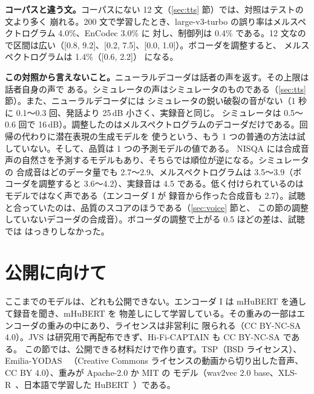 \documentclass[10pt,a4paper,twocolumn]{article}
\begin{document}
\textbf{コーパスと違う文。}コーパスにない 12 文（\ref{sec:tts} 節）では、対照はテストの文より多く
崩れる。200 文で学習したとき、large-v3-turbo の誤り率はメルスペクトログラム 4.0\%、EnCodec 3.0\% に
対し、制御列は 0.4\% である。12 文なので区間は広い（[0.8, 9.2]、[0.2, 7.5]、[0.0, 1.0]）。ボコーダを調整すると、
メルスペクトログラムは 1.4\%（[0.6, 2.2]） になる。

\textbf{この対照から言えないこと。}ニューラルデコーダは話者の声を返す。その上限は話者自身の声で
ある。シミュレータの声はシミュレータのものである（\ref{sec:tts} 節）。また、ニューラルデコーダには
シミュレータの鋭い破裂の音がない（1 秒に 0.1〜0.3 回、発話より 25\,dB 小さく、実録音と同じ。
シミュレータは 0.5〜0.6 回で 16\,dB）。調整したのはメルスペクトログラムのデコーダだけである。回帰の代わりに潜在表現の生成モデルを
使うという、もう 1 つの普通の方法は試していない。そして、品質は 1 つの予測モデルの値である。
NISQA には合成音声の自然さを予測するモデルもあり、そちらでは順位が逆になる。シミュレータの
合成音はどのデータ量でも 2.7〜2.9、メルスペクトログラムは 3.5〜3.9（ボコーダを調整すると
3.6〜4.2）、実録音は 4.5 である。低く付けられているのはモデルではなく声である（エンコーダ I が
録音から作った合成音も 2.7）。試聴と合っていたのは、品質のスコアのほうである（\ref{sec:voice} 節と、
この節の調整していないデコーダの合成音）。ボコーダの調整で上がる 0.5 ほどの差は、試聴では
はっきりしなかった。

\section{公開に向けて}\label{sec:release}

ここまでのモデルは、どれも公開できない。エンコーダ I は mHuBERT を通して録音を聞き、mHuBERT を
物差しにして学習している。その重みの一部はエンコーダの重みの中にあり、ライセンスは非営利に
限られる（CC BY-NC-SA 4.0）。JVS は研究用で再配布できず、Hi-Fi-CAPTAIN も CC BY-NC-SA である。
この節では、公開できる材料だけで作り直す。TSP（BSD ライセンス）、Emilia-YODAS~\cite{emilia}
（Creative Commons ライセンスの動画から切り出した音声、CC BY 4.0）、重みが Apache-2.0 か MIT の
モデル（wav2vec 2.0 base、XLS-R~\cite{xlsr}、日本語で学習した HuBERT~\cite{jtube}）である。
\end{document}
